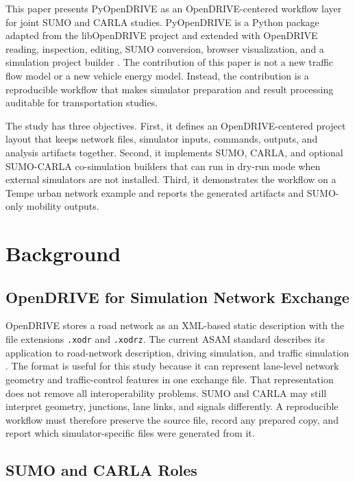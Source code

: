 \documentclass[10pt,numbered]{\selectedmanuscriptclass}
\begin{document}
This paper presents PyOpenDRIVE as an OpenDRIVE-centered workflow layer for
joint SUMO and CARLA studies. PyOpenDRIVE is a Python package adapted from the
libOpenDRIVE project and extended with OpenDRIVE reading, inspection, editing,
SUMO conversion, browser visualization, and a simulation project builder
\citep{libopendrive2023}. The contribution of this paper is not a new traffic
flow model or a new vehicle energy model. Instead, the contribution is a
reproducible workflow that makes simulator preparation and result processing
auditable for transportation studies.

The study has three objectives. First, it defines an OpenDRIVE-centered project
layout that keeps network files, simulator inputs, commands, outputs, and
analysis artifacts together. Second, it implements SUMO, CARLA, and optional
SUMO-CARLA co-simulation builders that can run in dry-run mode when external
simulators are not installed. Third, it demonstrates the workflow on a Tempe
urban network example and reports the generated artifacts and SUMO-only mobility
outputs.

\section{Background}\label{sec:background}

\subsection{OpenDRIVE for Simulation Network Exchange}

OpenDRIVE stores a road network as an XML-based static description with the
file extensions \texttt{.xodr} and \texttt{.xodrz}. The current ASAM standard
describes its application to road-network description, driving simulation, and
traffic simulation \citep{asam2026opendrive}. The format is useful for this
study because it can represent lane-level network geometry and traffic-control
features in one exchange file. That representation does not remove all
interoperability problems. SUMO and CARLA may still interpret geometry,
junctions, lane links, and signals differently. A reproducible workflow must
therefore preserve the source file, record any prepared copy, and report which
simulator-specific files were generated from it.

\subsection{SUMO and CARLA Roles}
\end{document}
